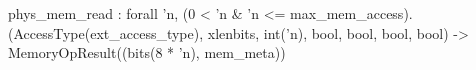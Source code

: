 phys_mem_read : forall 'n, (0 < 'n & 'n <= max_mem_access).
  (AccessType(ext_access_type), xlenbits, int('n), bool, bool, bool, bool) -> MemoryOpResult((bits(8 * 'n), mem_meta))